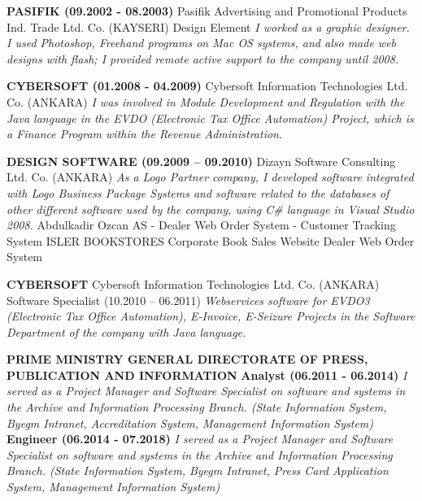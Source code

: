 \documentclass{article}
\begin{document}
\noindent \textbf{PASIFIK (09.2002 - 08.2003)}
\newline Pasifik Advertising and Promotional Products Ind. Trade Ltd. Co. (KAYSERI)
\newline Design Element
\newline \textit{I worked as a graphic designer. I used Photoshop, Freehand programs on Mac OS systems, and also made web designs with flash; I provided remote active support to the company until 2008.}

\noindent \textbf{CYBERSOFT (01.2008 - 04.2009)}
\newline Cybersoft Information Technologies Ltd. Co. (ANKARA)
\newline \textit{I was involved in Module Development and Regulation with the Java language in the EVDO (Electronic Tax Office Automation) Project, which is a Finance Program within the Revenue Administration.}

\noindent \textbf{DESIGN SOFTWARE (09.2009 -- 09.2010)}
\newline Dizayn Software Consulting Ltd. Co. (ANKARA)
\newline \textit{As a Logo Partner company, I developed software integrated with Logo Business Package Systems and software related to the databases of other different software used by the company, using C\# language in Visual Studio 2008.}
\newline Abdulkadir Ozcan AS - Dealer Web Order System - Customer Tracking System
\newline ISLER BOOKSTORES Corporate Book Sales Website Dealer Web Order System

\noindent \textbf{CYBERSOFT}
\newline Cybersoft Information Technologies Ltd. Co. (ANKARA)
\newline Software Specialist (10.2010 -- 06.2011)
\newline \textit{Webservices software for EVDO3 (Electronic Tax Office Automation), E-Invoice, E-Seizure Projects in the Software Department of the company with Java language.}

\noindent \textbf{PRIME MINISTRY GENERAL DIRECTORATE OF PRESS, PUBLICATION AND INFORMATION}
\newline \textbf{Analyst (06.2011 - 06.2014)}
\newline \textit{I served as a Project Manager and Software Specialist on software and systems in the Archive and Information Processing Branch. (State Information System, Byegm Intranet, Accreditation System, Management Information System)}
\newline \textbf{Engineer (06.2014 - 07.2018)}
\newline \textit{I served as a Project Manager and Software Specialist on software and systems in the Archive and Information Processing Branch. (State Information System, Byegm Intranet, Press Card Application System, Management Information System)}
\end{document}

